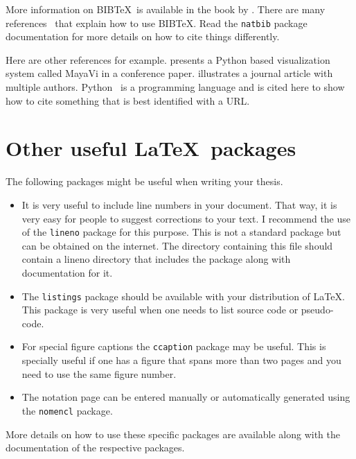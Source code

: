\documentclass[PhD]{iiitd}
\begin{document}
More information on BIB\TeX\ is available in the book by
\cite{lamport:86}.  There are many
references~\citep{lamport:86,prabhu:xx} that explain how to use
BIB\TeX.  Read the \verb+natbib+ package documentation for more
details on how to cite things differently.

Here are other references for example.  \citet{viz:mayavi} presents a
Python based visualization system called MayaVi in a conference paper.
\citet{pan:pr:flat-fst} illustrates a journal article with multiple
authors.  Python~\citep{py:python} is a programming language and is
cited here to show how to cite something that is best identified with
a URL.

\section{Other useful \LaTeX\ packages}

The following packages might be useful when writing your thesis.

\begin{itemize}  
\item It is very useful to include line numbers in your document.
  That way, it is very easy for people to suggest corrections to your
  text.  I recommend the use of the \texttt{lineno} package for this
  purpose.  This is not a standard package but can be obtained on the
  internet.  The directory containing this file should contain a
  lineno directory that includes the package along with documentation
  for it.

\item The \texttt{listings} package should be available with your
  distribution of \LaTeX.  This package is very useful when one needs
  to list source code or pseudo-code.

\item For special figure captions the \texttt{ccaption} package may be
  useful.  This is specially useful if one has a figure that spans
  more than two pages and you need to use the same figure number.

\item The notation page can be entered manually or automatically
  generated using the \texttt{nomencl} package.

\end{itemize}

More details on how to use these specific packages are available along
with the documentation of the respective packages.

\end{document}
